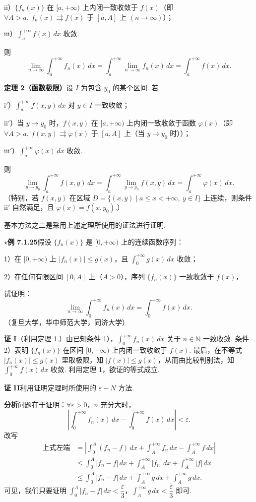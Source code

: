 \documentclass[UTF8, 12pt, fontset=fandol, oneside]{ctexart}
\begin{document}
ii）$\{f_n(x)\}$ 在 $[a,+\infty)$ 上内闭一致收敛于 $f(x)$（即 $\forall A>a,\ f_n(x)\rightrightarrows f(x)$ 于 $[a,A]$ 上 $(n\to\infty)$）；

iii）$\displaystyle\int_a^{+\infty}f(x)\,dx$ 收敛.

则
\[
\lim_{n\to\infty}\int_a^{+\infty}f_n(x)\,dx
=\int_a^{+\infty}\lim_{n\to\infty}f_n(x)\,dx
=\int_a^{+\infty}f(x)\,dx.
\]

\noindent\textbf{定理 2（函数极限）}\quad 设 $I$ 为包含 $y_0$ 的某个区间. 若

i$'$）$\displaystyle\int_a^{+\infty}f(x,y)\,dx$ 对 $y\in I$ 一致收敛；

ii$'$）当 $y\to y_0$ 时，$f(x,y)$ 在 $[a,+\infty)$ 上内闭一致收敛于函数 $\varphi(x)$（即 $\forall A>a,\ f(x,y)\rightrightarrows\varphi(x)$ 于 $[a,A]$ 上（当 $y\to y_0$ 时））；

iii$'$）$\displaystyle\int_a^{+\infty}\varphi(x)\,dx$ 收敛.

则
\[
\lim_{y\to y_0}\int_a^{+\infty}f(x,y)\,dx
=\int_a^{+\infty}\lim_{y\to y_0}f(x,y)\,dx
=\int_a^{+\infty}\varphi(x)\,dx.
\]
（特别，若 $f(x,y)$ 在区域 $D=\{(x,y)\mid a\le x<+\infty,\ y\in I\}$ 上连续，则条件 ii$'$ 自然满足，且 $\varphi(x)=f(x,y_0)$.）

基本方法之二是采用上述定理所使用的证法进行证明.

\noindent\textbf{$\star$例 7.1.25}\quad 假设 $\{f_n(x)\}$ 是 $[0,+\infty)$ 上的连续函数序列：

1）在 $[0,+\infty)$ 上 $|f_n(x)|\le g(x)$，且 $\displaystyle\int_0^{+\infty}g(x)\,dx$ 收敛；

2）在任何有限区间 $[0,A]$ 上（$A>0$），序列 $\{f_n(x)\}$ 一致收敛于 $f(x)$，

试证明：
\[
\lim_{n\to\infty}\int_0^{+\infty}f_n(x)\,dx
=\int_0^{+\infty}f(x)\,dx.
\]
（复旦大学，华中师范大学，同济大学）

\noindent\textbf{证 I}\quad （利用定理 1.）由已知条件 1），$\displaystyle\int_0^{+\infty}f_n(x)\,dx$ 关于 $n\in\mathbb{N}$ 一致收敛. 条件 2）表明 $\{f_n(x)\}$ 在区间 $[0,+\infty)$ 上内闭一致收敛于 $f(x)$. 最后，在不等式 $|f_n(x)|\le g(x)$ 里取极限，知 $|f(x)|\le g(x)$，从而由比较判别法，知 $\displaystyle\int_0^{+\infty}f(x)\,dx$ 收敛. 利用定理 1，欲证的等式成立.

\noindent\textbf{证 II}\quad 利用证明定理时所使用的 $\varepsilon-N$ 方法.

\noindent\textbf{分析}\quad 问题在于证明：$\forall\varepsilon>0$，$n$ 充分大时，
\[
\left|\int_0^{+\infty}f_n(x)\,dx-\int_0^{+\infty}f(x)\,dx\right|<\varepsilon.
\]
改写
\[
\begin{aligned}
\text{上式左端}
&=\left|\int_0^A(f_n-f)\,dx+\int_A^{+\infty}f_n\,dx-\int_A^{+\infty}f\,dx\right|\\
&\le\int_0^A|f_n-f|\,dx+\int_A^{+\infty}|f_n|\,dx+\int_A^{+\infty}|f|\,dx\\
&\le\int_0^A|f_n-f|\,dx+\int_A^{+\infty}g\,dx+\int_A^{+\infty}g\,dx.
\end{aligned}
\]
可见，我们只要证明 $\displaystyle\int_0^A|f_n-f|\,dx<\dfrac{\varepsilon}{3}$，$\displaystyle\int_A^{+\infty}g\,dx<\dfrac{\varepsilon}{3}$ 即可.
\end{document}
